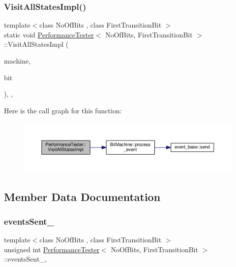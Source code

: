 \subsubsection{\texorpdfstring{Visit\+All\+States\+Impl()}{VisitAllStatesImpl()}}
{\footnotesize\ttfamily template$<$class No\+Of\+Bits , class First\+Transition\+Bit $>$ \\
static void \mbox{\hyperlink{class_performance_tester}{Performance\+Tester}}$<$ No\+Of\+Bits, First\+Transition\+Bit $>$\+::Visit\+All\+States\+Impl (\begin{DoxyParamCaption}\item[{\mbox{\hyperlink{struct_bit_machine}{Bit\+Machine}}$<$ No\+Of\+Bits, First\+Transition\+Bit $>$ \&}]{machine,  }\item[{unsigned int}]{bit }\end{DoxyParamCaption})\hspace{0.3cm}{\ttfamily [inline]}, {\ttfamily [static]}, {\ttfamily [private]}}

Here is the call graph for this function\+:
\nopagebreak
\begin{figure}[H]
\begin{center}
\leavevmode
\includegraphics[width=350pt]{class_performance_tester_accdf29cc546c012cd3db37a36cb555d4_cgraph}
\end{center}
\end{figure}


\subsection{Member Data Documentation}
\mbox{\label{class_performance_tester_ab776613ffedc9f7f5e05d1b79380a250}} 
\subsubsection{\texorpdfstring{events\+Sent\+\_\+}{eventsSent\_}}
{\footnotesize\ttfamily template$<$class No\+Of\+Bits , class First\+Transition\+Bit $>$ \\
unsigned int \mbox{\hyperlink{class_performance_tester}{Performance\+Tester}}$<$ No\+Of\+Bits, First\+Transition\+Bit $>$\+::events\+Sent\+\_\+\hspace{0.3cm}{\ttfamily [static]}, {\ttfamily [private]}}

